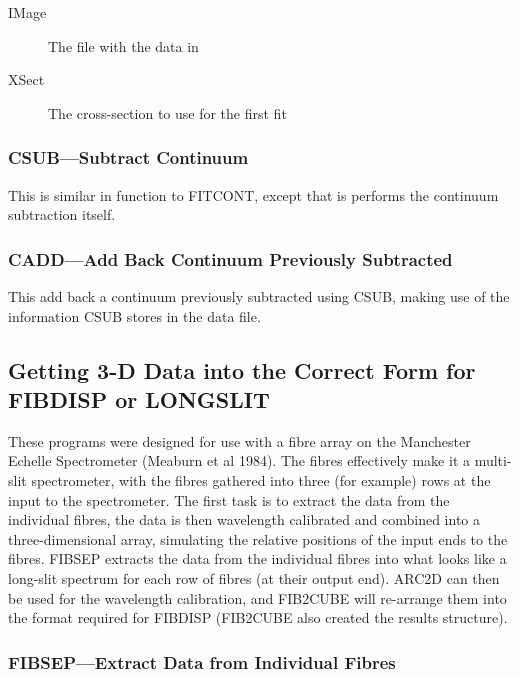 \documentclass[11pt,twoside]{article}
\newcommand{\xlabel}[1]{}
\begin{document}
\begin{description}
\item[IMage] The file with the data in
\item[XSect] The cross-section to use for the first fit
\end{description}


\subsubsection{\xlabel{csubsubtract_continuum}CSUB---Subtract Continuum}

This is similar in function to FITCONT, except that is performs the
continuum subtraction itself.

\subsubsection{\xlabel{caddadd_back_continuum_previously_subtracted}CADD---Add Back Continuum Previously Subtracted}

This add back a continuum previously subtracted using CSUB, making use
of the information CSUB stores in the data file.

\subsection{\xlabel{getting_3d_data_into_the_correct_form}\label{getting_3d_data_into_the_correct_form}Getting 3-D Data into the Correct Form for FIBDISP or LONGSLIT}

These programs were designed for use with a fibre array on the
Manchester Echelle Spectrometer (Meaburn et al 1984).
The fibres effectively make it a multi-slit spectrometer, with the
fibres gathered into three (for example) rows at the input to the
spectrometer.
The first task is to extract the data from the individual fibres, the
data is then wavelength calibrated and combined into a three-dimensional
array, simulating the relative positions of the input ends to the
fibres.
FIBSEP extracts the data from the individual fibres into what looks like a
long-slit spectrum for each row of fibres (at their output end).
ARC2D can then be used for the wavelength calibration, and FIB2CUBE will
re-arrange them into the format required for FIBDISP (FIB2CUBE also
created the results structure).

\subsubsection{\xlabel{fibsepextract_data_from_individual_fibres}FIBSEP---Extract Data from Individual Fibres}
\end{document}
